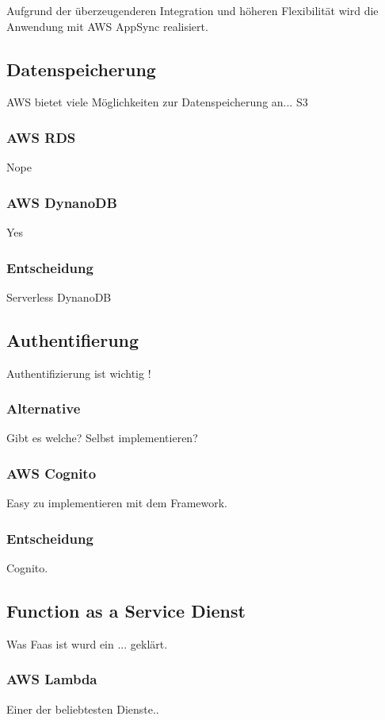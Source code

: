 Aufgrund der überzeugenderen Integration und höheren Flexibilität wird die Anwendung mit AWS AppSync realisiert.



\subsection{Datenspeicherung}
AWS bietet viele Möglichkeiten zur Datenspeicherung an...
S3
\subsubsection{AWS RDS}
Nope

\subsubsection{AWS DynanoDB}
Yes

\subsubsection{Entscheidung}
Serverless DynanoDB




\subsection{Authentifierung}
Authentifizierung ist wichtig !

\subsubsection{Alternative}
Gibt es welche? Selbst implementieren?

\subsubsection{AWS Cognito}
Easy zu implementieren mit dem Framework.

\subsubsection{Entscheidung}
Cognito.


\subsection{Function as a Service Dienst}
Was Faas ist wurd ein ... geklärt.

\subsubsection{AWS Lambda}
Einer der beliebtesten Dienste..

